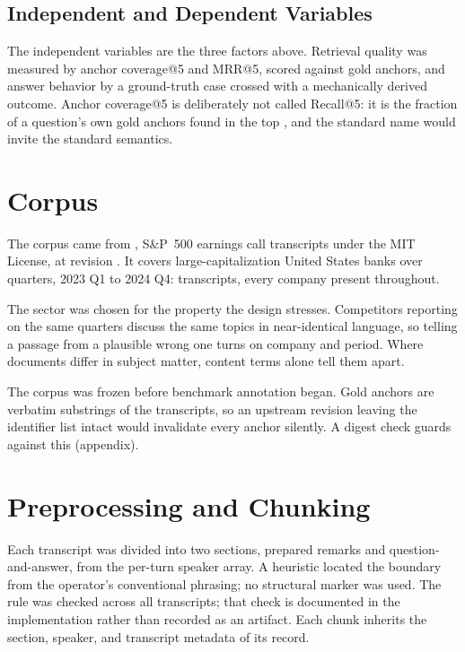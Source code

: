 \subsection{Independent and Dependent Variables}

The independent variables are the three factors above. Retrieval quality was
measured by anchor coverage@5 and MRR@5, scored against gold anchors, and answer
behavior by a ground-truth case crossed with a mechanically derived outcome.
Anchor coverage@5 is deliberately not called Recall@5: it is the fraction of a
question's own gold anchors found in the top \thesisTopK{}, and the standard
name would invite the standard semantics.

\section{Corpus}

The corpus came from \thesisCorpusDataset{} \parencite{kurry2025}, S\&P~500
earnings call transcripts under the MIT License, at revision
\thesisCorpusRevision{}. It covers \thesisNumCompanies{} large-capitalization
United States banks over \thesisNumQuarters{} quarters, 2023 Q1 to 2024 Q4:
\thesisNumTranscripts{} transcripts, every company present throughout.

The sector was chosen for the property the design stresses. Competitors reporting
on the same quarters discuss the same topics in near-identical language, so
telling a passage from a plausible wrong one turns on company and period. Where
documents differ in subject matter, content terms alone tell them apart.

The corpus was frozen before benchmark annotation began. Gold anchors are
verbatim substrings of the transcripts, so an upstream revision leaving the
identifier list intact would invalidate every anchor silently. A digest check
guards against this (appendix).

\section{Preprocessing and Chunking}

Each transcript was divided into two sections, prepared remarks and
question-and-answer, from the per-turn speaker array.
A heuristic located the boundary from the operator's conventional phrasing; no
structural marker was used. The rule was checked across all
\thesisNumTranscripts{} transcripts; that check is documented in the
implementation rather than recorded as an artifact. Each chunk inherits the
section, speaker, and transcript metadata of its record.

